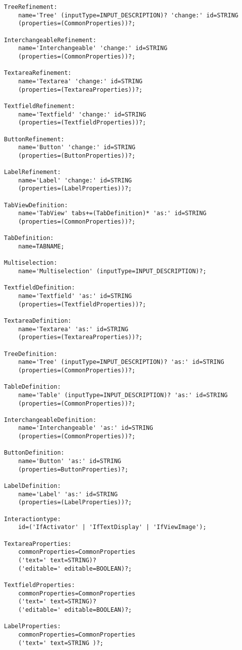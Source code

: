 \begin{lstlisting}[caption = Grammatik der 3. Iteration]
TreeRefinement:
	name='Tree' (inputType=INPUT_DESCRIPTION)? 'change:' id=STRING
	(properties=(CommonProperties))?;

InterchangeableRefinement:
	name='Interchangeable' 'change:' id=STRING
	(properties=(CommonProperties))?;

TextareaRefinement:
	name='Textarea' 'change:' id=STRING
	(properties=(TextareaProperties))?;

TextfieldRefinement:
	name='Textfield' 'change:' id=STRING
	(properties=(TextfieldProperties))?;

ButtonRefinement:
	name='Button' 'change:' id=STRING
	(properties=(ButtonProperties))?;

LabelRefinement:
	name='Label' 'change:' id=STRING
	(properties=(LabelProperties))?;

TabViewDefinition:
	name='TabView' tabs+=(TabDefinition)* 'as:' id=STRING
	(properties=(CommonProperties))?;

TabDefinition:
	name=TABNAME;

Multiselection:
	name='Multiselection' (inputType=INPUT_DESCRIPTION)?;

TextfieldDefinition:
	name='Textfield' 'as:' id=STRING
	(properties=(TextfieldProperties))?;

TextareaDefinition:
	name='Textarea' 'as:' id=STRING
	(properties=(TextareaProperties))?;

TreeDefinition:
	name='Tree' (inputType=INPUT_DESCRIPTION)? 'as:' id=STRING
	(properties=(CommonProperties))?;

TableDefinition:
	name='Table' (inputType=INPUT_DESCRIPTION)? 'as:' id=STRING
	(properties=(CommonProperties))?;

InterchangeableDefinition:
	name='Interchangeable' 'as:' id=STRING
	(properties=(CommonProperties))?;

ButtonDefinition:
	name='Button' 'as:' id=STRING
	(properties=ButtonProperties)?;

LabelDefinition:
	name='Label' 'as:' id=STRING
	(properties=(LabelProperties))?;

Interactiontype:
	id=('IfActivator' | 'IfTextDisplay' | 'IfViewImage');

TextareaProperties:
	commonProperties=CommonProperties
	('text=' text=STRING)?
	('editable=' editable=BOOLEAN)?;

TextfieldProperties:
	commonProperties=CommonProperties
	('text=' text=STRING)?
	('editable=' editable=BOOLEAN)?;

LabelProperties:
	commonProperties=CommonProperties
	('text=' text=STRING )?;


\end{lstlisting}
